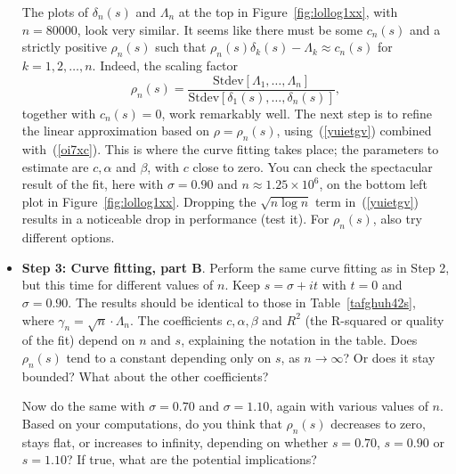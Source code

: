 \documentclass[oneside,10pt]{book}
\begin{document}
\begin{itemize}
The plots of $\delta_n(s)$ and $\Lambda_n$ at the top in Figure~\ref{fig:lollog1xx}, with $n = \num{80000}$, look very similar. 
It seems like there must be some $c_n(s)$ and a strictly positive 
$\rho_n(s)$  such that
 $\rho_n(s) \delta_k(s) - \Lambda_k\approx c_n(s)$ for $k=1,2,\dots, n$. Indeed, the \textcolor{index}{scaling factor}  
$$
\rho_n(s) = \frac{\text{Stdev}[\Lambda_1,\dots,\Lambda_n]}{\text{Stdev}[\delta_1(s),\dots,\delta_n(s)]},
$$
 together with $c_n(s)=0$, 
work remarkably well. 
The next step is to refine the linear approximation based on $\rho=\rho_n(s)$,  
 using~(\ref{yuietgv}) combined with~(\ref{oi7xc}). This is where the curve fitting takes place; the parameters to estimate are $c, \alpha$ and $\beta$, with $c$ close to zero. 
You can check the spectacular result of the fit, here with $\sigma=0.90$ and $n\approx 1.25\times 10^6$, on the bottom left plot in Figure~\ref{fig:lollog1xx}. Dropping the $\sqrt{n\log n}$ term in~(\ref{yuietgv}) results in a noticeable drop in performance (test it).
For $\rho_n(s)$, also try different options.
\vspace{1ex}
\item[] {\bf Step 3:  Curve fitting, part B}. Perform the same curve fitting as in Step 2, but this time for different values of $n$. Keep
 $s = \sigma +it$ with $t=0$ and $\sigma = 0.90$. The results should be identical to those in Table~\ref{tafghuh42s}, where $\gamma_n=\sqrt{n}\cdot\Lambda_n$. The coefficients $c,\alpha,\beta$ and $R^2$ (the \textcolor{index}{R-squared} or quality of the fit)
 depend on $n$ and $s$, explaining the notation in the table. Does $\rho_n(s)$ tend to a constant depending only on $s$, as $n\rightarrow\infty$? Or does it stay bounded? What about the other coefficients?
\vspace{1ex}

Now do the same with $\sigma= 0.70$ and $\sigma=1.10$, again with various values of $n$. Based on your computations, do you think that $\rho_n(s)$ decreases to zero, stays flat, or increases to infinity, depending on whether $s=0.70$, $s=0.90$ or $s=1.10$? If true, what are the potential implications?


\end{itemize}
\end{document}
